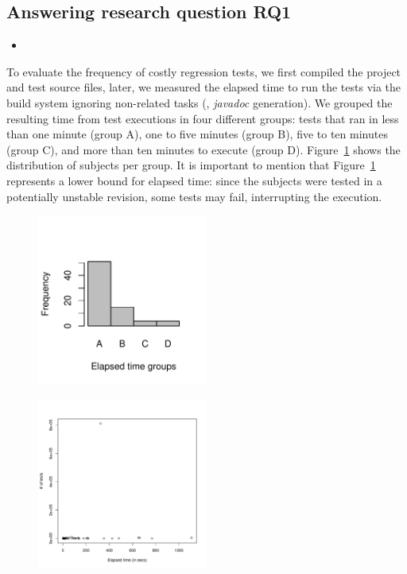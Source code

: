 \subsection{Answering research question RQ1}
\label{sec:rqone}

\begin{itemize}
    \item \RQONE
\end{itemize}

To evaluate the frequency of costly regression tests, we first compiled the project and
test source files, later, we measured the elapsed time to run the
tests via the build system ignoring non-related tasks (\eg,
\emph{javadoc} generation).  We grouped the resulting time from test
executions in four different groups: tests that ran in less than one
minute (group A), one to five minutes (group B), five to ten minutes
(group C), and more than ten minutes to execute (group D).
Figure~\ref{fig:timecost-barplot} shows the distribution of subjects
per group. It is important to mention that
Figure~\ref{fig:timecost-barplot} represents a lower bound for elapsed
time: since the subjects were tested in a potentially unstable
revision, some tests may fail, interrupting the execution.

\begin{figure}[t!]
    \centering
    \includegraphics[width=0.5\textwidth]{plots/timecost-barplot/timecost-barplot.pdf}
    \caption{\label{fig:timecost-barplot} }
\end{figure}

\begin{figure}[t!]
    \centering
    \includegraphics[width=0.5\textwidth]{plots/teststime-scatter/timetests-scatter.pdf}
    \caption{\label{fig:timetests-scatter} }
\end{figure}

